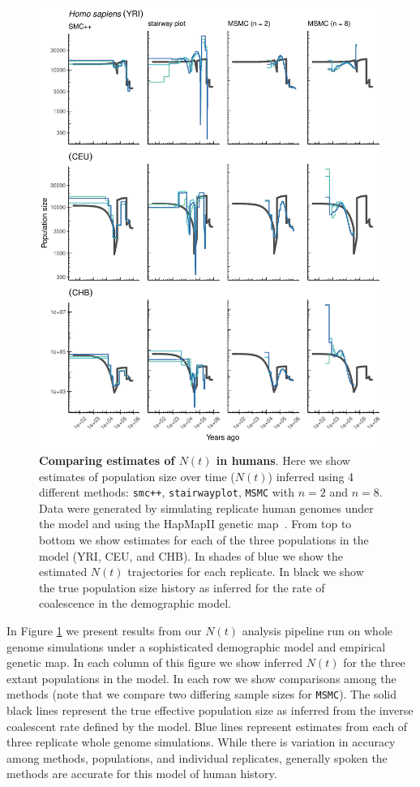 \documentclass[12pt,halfline,a4paper]{ouparticle}
\newcommand{\MSMC}{\texttt{MSMC}\xspace}
\newcommand{\smcpp}{\texttt{smc++}\xspace}
\begin{document}
\begin{figure}
\begin{center}
\includegraphics[width=0.8\linewidth]{display_items/homo_sapiens_mask_Ragsdale.pdf}
\caption{\textbf{Comparing estimates of $N(t)$ in humans}. Here we show estimates of population
size over time ($N(t)$) inferred using 4 different methods: \smcpp, \texttt{stairwayplot},
\MSMC with $n=2$ and $n=8$. Data were generated by simulating
replicate human genomes under the \cite{ragsdale2019models} model and using the
HapMapII genetic map~\citep{international2007second}. From top to bottom we show estimates for each
of the three populations in the model (YRI, CEU, and CHB). In shades of blue we show the estimated
$N(t)$ trajectories for each replicate. In black we show the true population size history as inferred
for the rate of coalescence in the demographic model.}
\label{fig:n_t_ragsdale}
\end{center}
\end{figure}


In Figure \ref{fig:n_t_ragsdale} we present results from our $N(t)$ analysis pipeline
run on whole genome simulations under a sophisticated demographic model
and empirical genetic map. In each column of this figure
we show inferred $N(t)$ for the three extant populations in the model.
In each row we show comparisons among the methods (note that we compare two differing
sample sizes for \MSMC). The solid black lines represent the true effective population
size as inferred from the inverse coalescent rate defined by the model.
Blue lines represent estimates from each of three replicate whole genome simulations.
While there is variation in accuracy among methods, populations, and individual replicates,
generally spoken the methods are accurate for this model of human history.
\end{document}
